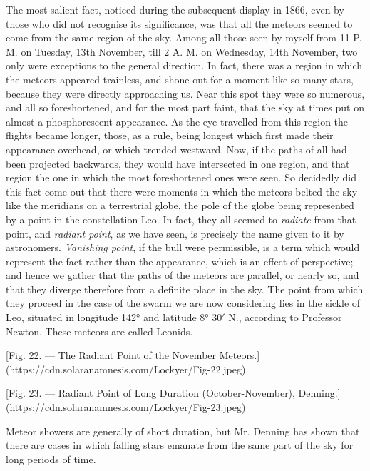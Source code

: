\documentclass[a4paper, 12pt, oneside, polutonikogreek, english]{article}
\begin{document}
The most salient fact, noticed during the subsequent display in 1866, even by those who did not recognise its significance, was that all the meteors seemed to come from the same region of the sky. Among all those seen by myself from 11 P. M. on Tuesday, 13th November, till 2 A. M. on Wednesday, 14th November, two only were exceptions to the general direction. In fact, there was a region in which the meteors appeared trainless, and shone out for a moment like so many stars, because they were directly approaching us. Near this spot they were so numerous, and all so foreshortened, and for the most part faint, that the sky at times put on almost a phosphorescent appearance. As the eye travelled from this region the flights became longer, those, as a rule, being longest which first made their appearance overhead, or which trended westward. Now, if the paths of all had been projected backwards, they would have intersected in one region, and that region the one in which the most foreshortened ones were seen. So decidedly did this fact come out that there were moments in which the meteors belted the sky like the meridians on a terrestrial globe, the pole of the globe being represented by a point in the constellation Leo. In fact, they all seemed to \emph{radiate} from that point, and \emph{radiant point}, as we have seen, is precisely the name given to it by astronomers. \emph{Vanishing point}, if the bull were permissible, is a term which would represent the fact rather than the appearance, which is an effect of perspective; and hence we gather that the paths of the meteors are parallel, or nearly so, and that they diverge therefore from a definite place in the sky. The point from which they proceed in the case of the swarm we are now considering lies in the sickle of Leo, situated in longitude 142° and latitude 8° 30$\prime$ N., according to Professor Newton. These meteors are called Leonids.

[Fig. 22. --- The Radiant Point of the November Meteors.](https://cdn.solaranamnesis.com/Lockyer/Fig-22.jpeg)

[Fig. 23. --- Radiant Point of Long Duration (October-November), Denning.](https://cdn.solaranamnesis.com/Lockyer/Fig-23.jpeg)

Meteor showers are generally of short duration, but Mr. Denning has shown that there are cases in which falling stars emanate from the same part of the sky for long periods of time.
\end{document}
